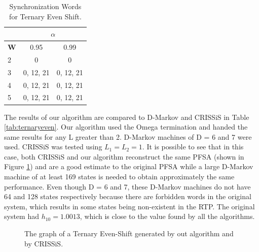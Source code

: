 {\begin{table}
\centering
\begin{tabular}{|l|c|c|}
\hline
 & \multicolumn{2}{c|}{\textbf{$\alpha$}}\\
 \hline
\textbf{W} & 0.95 & 0.99 \\
\hline
2 & 0 & 0 \\ 
3 & 0, 12, 21 & 0, 12, 21 \\ 
4 & 0, 12, 21 & 0, 12, 21 \\ 
5 & 0, 12, 21 & 0, 12, 21 \\
 \hline
\end{tabular}
\caption{Synchronization Words for Ternary Even Shift. \label{tab:ternaryevensynch}}
\end{table}

The results of our algorithm are compared to D-Markov and CRISSiS in Table \ref{tab:ternaryeven}. Our algorithm used the Omega termination and handed the same results for any L greater than 2. D-Markov machines of D = 6 and 7 were used. CRISSiS was tested using $L_1 = L_2 = 1$. It is possible to see that in this case, both CRISSiS and our algorithm reconstruct the same PFSA (shown in Figure \ref{fig:ternaryevengen}) and are a good estimate to the original PFSA  while a large D-Markov machine of at least 169 states is needed to obtain approximately the same performance. Even though D = 6 and 7, these D-Markov machines do not have 64 and 128 states respectively because there are forbidden words in the original system, which results in some states being non-existent in the RTP. The original system had $h_{10} = 1.0013$, which is close to the value found by all the algorithms.

\begin{figure}
\centering
{}
\caption{The graph of a Ternary Even-Shift generated by out algorithm and by CRISSiS.\label{fig:ternaryevengen}}
\end{figure}

}
